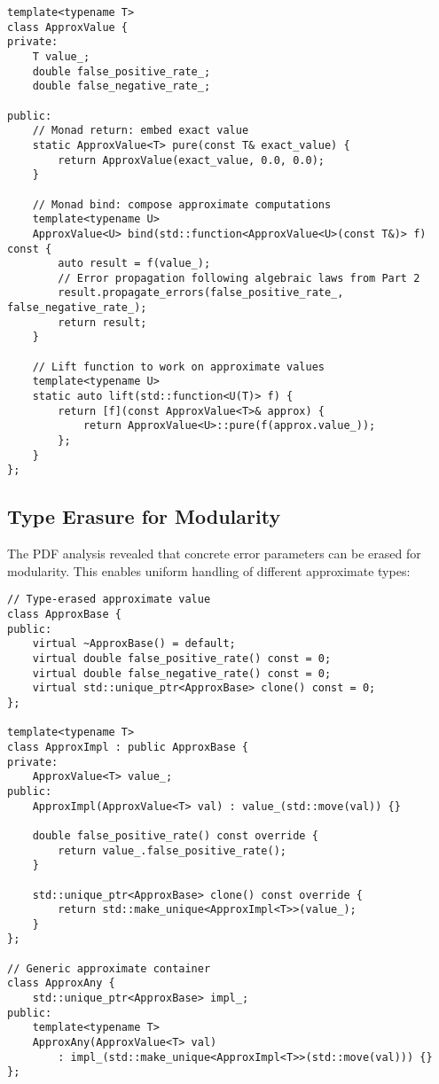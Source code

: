 \documentclass[11pt,final,hidelinks]{article}
\begin{document}
\begin{verbatim}
template<typename T>
class ApproxValue {
private:
    T value_;
    double false_positive_rate_;
    double false_negative_rate_;
    
public:
    // Monad return: embed exact value
    static ApproxValue<T> pure(const T& exact_value) {
        return ApproxValue(exact_value, 0.0, 0.0);
    }
    
    // Monad bind: compose approximate computations
    template<typename U>
    ApproxValue<U> bind(std::function<ApproxValue<U>(const T&)> f) const {
        auto result = f(value_);
        // Error propagation following algebraic laws from Part 2
        result.propagate_errors(false_positive_rate_, false_negative_rate_);
        return result;
    }
    
    // Lift function to work on approximate values
    template<typename U>
    static auto lift(std::function<U(T)> f) {
        return [f](const ApproxValue<T>& approx) {
            return ApproxValue<U>::pure(f(approx.value_));
        };
    }
};
\end{verbatim}

\subsection{Type Erasure for Modularity}

The PDF analysis revealed that concrete error parameters can be erased for modularity. This enables uniform handling of different approximate types:

\begin{verbatim}
// Type-erased approximate value
class ApproxBase {
public:
    virtual ~ApproxBase() = default;
    virtual double false_positive_rate() const = 0;
    virtual double false_negative_rate() const = 0;
    virtual std::unique_ptr<ApproxBase> clone() const = 0;
};

template<typename T>
class ApproxImpl : public ApproxBase {
private:
    ApproxValue<T> value_;
public:
    ApproxImpl(ApproxValue<T> val) : value_(std::move(val)) {}
    
    double false_positive_rate() const override {
        return value_.false_positive_rate();
    }
    
    std::unique_ptr<ApproxBase> clone() const override {
        return std::make_unique<ApproxImpl<T>>(value_);
    }
};

// Generic approximate container
class ApproxAny {
    std::unique_ptr<ApproxBase> impl_;
public:
    template<typename T>
    ApproxAny(ApproxValue<T> val) 
        : impl_(std::make_unique<ApproxImpl<T>>(std::move(val))) {}
};
\end{verbatim}
\end{document}
